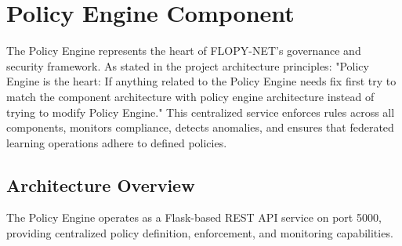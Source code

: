 \section{Policy Engine Component}
\label{sec:policy-engine}

The Policy Engine represents the heart of FLOPY-NET's governance and security framework. As stated in the project architecture principles: "Policy Engine is the heart: If anything related to the Policy Engine needs fix first try to match the component architecture with policy engine architecture instead of trying to modify Policy Engine." This centralized service enforces rules across all components, monitors compliance, detects anomalies, and ensures that federated learning operations adhere to defined policies.

\subsection{Architecture Overview}

The Policy Engine operates as a Flask-based REST API service on port 5000, providing centralized policy definition, enforcement, and monitoring capabilities.

